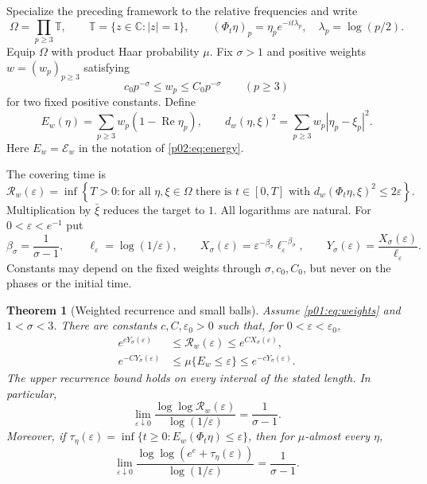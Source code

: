\documentclass[11pt,letterpaper]{article}
\newtheorem{theorem}{Theorem}[section]
\theoremstyle{definition}
\theoremstyle{remark}
\newcommand{\T}{\mathbb T}
\newcommand{\C}{\mathbb C}
\newcommand{\eps}{\varepsilon}
\newcommand{\Ree}{\operatorname{Re}}
\newcommand{\1}{\mathbf 1}
\begin{document}
Specialize the preceding framework to the relative frequencies and write
\[
 \Omega=\prod_{p\ge3}\T,\qquad
 \T=\{z\in\C:|z|=1\},\qquad
 (\Phi_t\eta)_p=\eta_p e^{-it\lambda_p},\quad
 \lambda_p=\log(p/2).
\]
Equip $\Omega$ with product Haar probability $\mu$. Fix $\sigma>1$ and
positive weights $w=(w_p)_{p\ge3}$ satisfying
\begin{equation}\label{p01:eq:weights}
 c_0p^{-\sigma}\le w_p\le C_0p^{-\sigma}
 \qquad(p\ge3)
\end{equation}
for two fixed positive constants. Define
\begin{equation}\label{p01:eq:energy}
 E_w(\eta)=\sum_{p\ge3}w_p(1-\Ree\eta_p),\qquad
 d_w(\eta,\xi)^2=\sum_{p\ge3}w_p|\eta_p-\xi_p|^2.
\end{equation}
Here $E_w=\mathcal E_w$ in the notation of \eqref{p02:eq:energy}.

The covering time is
\begin{equation}\label{p01:eq:coverdef}
 \mathcal R_w(\eps)=\inf\left\{T>0:
  \text{for all }\eta,\xi\in\Omega\text{ there is }t\in[0,T]
  \text{ with }d_w(\Phi_t\eta,\xi)^2\le2\eps\right\}.
\end{equation}
Multiplication by $\bar\xi$ reduces the target to $1$. All logarithms
are natural. For $0<\eps<e^{-1}$ put
\begin{equation}\label{p01:eq:scales}
 \beta_\sigma=\frac1{\sigma-1},\qquad
 \ell_\eps=\log(1/\eps),\qquad
 X_\sigma(\eps)=\eps^{-\beta_\sigma}\ell_\eps^{-\beta_\sigma},\qquad
 Y_\sigma(\eps)=\frac{X_\sigma(\eps)}{\ell_\eps}.
\end{equation}
Constants may depend on the fixed weights through
$\sigma,c_0,C_0$, but never on the phases or the initial time.

\begin{theorem}[Weighted recurrence and small balls]\label{p01:thm:flow}
Assume \eqref{p01:eq:weights} and $1<\sigma<3$. There are constants
$c,C,\eps_0>0$ such that, for $0<\eps<\eps_0$,
\begin{align}
 e^{cY_\sigma(\eps)}
 &\le\mathcal R_w(\eps)\le e^{CX_\sigma(\eps)},
 \label{p01:eq:flowbounds}\\
 e^{-CY_\sigma(\eps)}
 &\le\mu\{E_w\le\eps\}\le e^{-cY_\sigma(\eps)}.
 \label{p01:eq:smallball}
\end{align}
The upper recurrence bound holds on every interval of the stated
length. In particular,
\begin{equation}\label{p01:eq:flowexponent}
 \lim_{\eps\downarrow0}
 \frac{\log\log\mathcal R_w(\eps)}{\log(1/\eps)}
 =\frac1{\sigma-1}.
\end{equation}
Moreover, if
$\tau_\eta(\eps)=\inf\{t\ge0:E_w(\Phi_t\eta)\le\eps\}$, then for
$\mu$-almost every $\eta$,
\begin{equation}\label{p01:eq:flowwaiting}
 \lim_{\eps\downarrow0}
 \frac{\log\log(e^e+\tau_\eta(\eps))}{\log(1/\eps)}
 =\frac1{\sigma-1}.
\end{equation}
\end{theorem}
\end{document}
